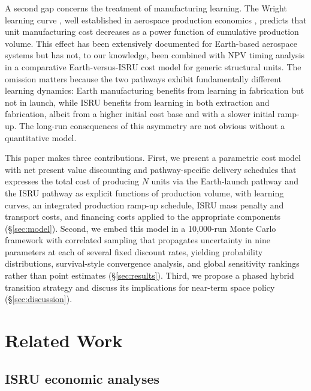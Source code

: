 \documentclass[preprint,12pt]{elsarticle}
\begin{document}
A second gap concerns the treatment of manufacturing learning. The Wright learning curve \cite{wright1936}, well established in aerospace production economics \cite{wertz2011}, predicts that unit manufacturing cost decreases as a power function of cumulative production volume. This effect has been extensively documented for Earth-based aerospace systems \cite{argote1990,nagy2013} but has not, to our knowledge, been combined with NPV timing analysis in a comparative Earth-versus-ISRU cost model for generic structural units. The omission matters because the two pathways exhibit fundamentally different learning dynamics: Earth manufacturing benefits from learning in fabrication but not in launch, while ISRU benefits from learning in both extraction and fabrication, albeit from a higher initial cost base and with a slower initial ramp-up. The long-run consequences of this asymmetry are not obvious without a quantitative model.

This paper makes three contributions. First, we present a parametric cost model with net present value discounting and pathway-specific delivery schedules that expresses the total cost of producing $N$ units via the Earth-launch pathway and the ISRU pathway as explicit functions of production volume, with learning curves, an integrated production ramp-up schedule, ISRU mass penalty and transport costs, and financing costs applied to the appropriate components (\S\ref{sec:model}). Second, we embed this model in a 10{,}000-run Monte Carlo framework with correlated sampling that propagates uncertainty in nine parameters at each of several fixed discount rates, yielding probability distributions, survival-style convergence analysis, and global sensitivity rankings rather than point estimates (\S\ref{sec:results}). Third, we propose a phased hybrid transition strategy and discuss its implications for near-term space policy (\S\ref{sec:discussion}).

\section{Related Work}
\label{sec:related}

\subsection{ISRU economic analyses}
\end{document}
